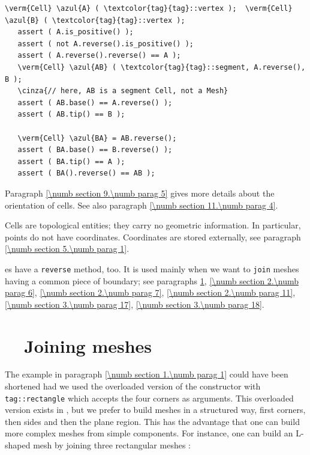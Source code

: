 \begin{Verbatim}[commandchars=\\\{\},formatcom=\small\tt,baselinestretch=0.94]
   \verm{Cell} \azul{A} ( \textcolor{tag}{tag}::vertex );  \verm{Cell} \azul{B} ( \textcolor{tag}{tag}::vertex );
   assert ( A.is_positive() );
   assert ( not A.reverse().is_positive() );
   assert ( A.reverse().reverse() == A );
   \verm{Cell} \azul{AB} ( \textcolor{tag}{tag}::segment, A.reverse(), B );
   \cinza{// here, AB is a segment Cell, not a Mesh}
   assert ( AB.base() == A.reverse() );
   assert ( AB.tip() == B );

   \verm{Cell} \azul{BA} = AB.reverse();
   assert ( BA.base() == B.reverse() );
   assert ( BA.tip() == A );
   assert ( BA().reverse() == AB );
\end{Verbatim}

Paragraph \ref{\numb section 9.\numb parag 5} gives more details about the orientation of cells.
See also paragraph \ref{\numb section 11.\numb parag 4}.

Cells are topological entities; they carry no geometric information.
In particular, points do not have coordinates.
Coordinates are stored externally, see paragraph \ref{\numb section 5.\numb parag 1}.

{\small\tt {}}es have a {\small\tt reverse} method, too.
It is used mainly when we want to {\small\tt join} meshes having a common piece of boundary;
see paragraphs \ref{\numb section 1.\numb parag 3}, \ref{\numb section 2.\numb parag 6},
\ref{\numb section 2.\numb parag 7}, \ref{\numb section 2.\numb parag 11},
\ref{\numb section 3.\numb parag 17}, \ref{\numb section 3.\numb parag 18}.


\section{~~Joining meshes}\label{\numb section 1.\numb parag 3}

The example in paragraph \ref{\numb section 1.\numb parag 1} could have been shortened
had we used the overloaded version of the {\small\tt {}} constructor with
{\small\tt \textcolor{tag}{tag}::rectangle} which accepts the four corners as arguments. 
This overloaded version exists in \maniFEM, but we prefer to build meshes in a structured way, 
first corners, then sides and then the plane region. 
This has the advantage that one can build more complex meshes from simple components. 
For instance, one can build an L-shaped mesh by joining three rectangular meshes :

